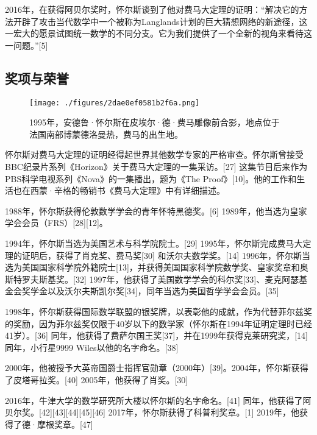 2016年，在获得阿贝尔奖时，怀尔斯谈到了他对费马大定理的证明：“解决它的方法开辟了攻击当代数学中一个被称为Langlands计划的巨大猜想网络的新途径，这一宏大的愿景试图统一数学的不同分支。它为我们提供了一个全新的视角来看待这一问题。”[5]
\subsection{奖项与荣誉}
\begin{figure}[ht]
\centering
\texttt{[image: ./figures/2dae0ef0581b2f6a.png]}
\caption{1995年，安德鲁·怀尔斯在皮埃尔·德·费马雕像前合影，地点位于法国南部博蒙德洛曼热，费马的出生地。} \label{fig_Andrew_2}
\end{figure}
怀尔斯对费马大定理的证明经得起世界其他数学专家的严格审查。怀尔斯曾接受BBC纪录片系列《Horizon》关于费马大定理的一集采访。[27] 这集节目后来作为PBS科学电视系列《Nova》的一集播出，题为《The Proof》[10]。他的工作和生活也在西蒙·辛格的畅销书《费马大定理》中有详细描述。

1988年，怀尔斯获得伦敦数学学会的青年怀特黑德奖。[6] 1989年，他当选为皇家学会会员（FRS）[28][12]。

1994年，怀尔斯当选为美国艺术与科学院院士。[29] 1995年，怀尔斯完成费马大定理的证明后，获得了肖克奖、费马奖[30] 和沃尔夫数学奖。[14] 1996年，怀尔斯当选为美国国家科学院外籍院士[13]，并获得美国国家科学院数学奖、皇家奖章和奥斯特罗夫斯基奖。[32] 1997年，他获得了美国数学学会的科尔奖[33]、麦克阿瑟基金会奖学金以及沃尔夫斯凯尔奖[34]，同年当选为美国哲学学会会员。[35]

1998年，怀尔斯获得国际数学联盟的银奖牌，以表彰他的成就，作为代替菲尔兹奖的奖励，因为菲尔兹奖仅限于40岁以下的数学家（怀尔斯在1994年证明定理时已经41岁）。[36] 同年，他获得了费萨尔国王奖[37]，并在1999年获得克莱研究奖，[14] 同年，小行星9999 Wiles以他的名字命名。[38]

2000年，他被授予大英帝国爵士指挥官勋章（2000年）[39]。2004年，怀尔斯获得了皮塔哥拉奖。[40] 2005年，他获得了肖奖。[30]

2016年，牛津大学的数学研究所大楼以怀尔斯的名字命名。[41] 同年，他获得了阿贝尔奖。[42][43][44][45][46] 2017年，怀尔斯获得了科普利奖章。[1] 2019年，他获得了德·摩根奖章。[47]